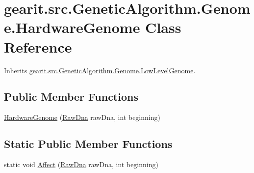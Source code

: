 \hypertarget{classgearit_1_1src_1_1_genetic_algorithm_1_1_genome_1_1_hardware_genome}{\section{gearit.\+src.\+Genetic\+Algorithm.\+Genome.\+Hardware\+Genome Class Reference}
\label{classgearit_1_1src_1_1_genetic_algorithm_1_1_genome_1_1_hardware_genome}
}


Inherits \hyperlink{classgearit_1_1src_1_1_genetic_algorithm_1_1_genome_1_1_low_level_genome}{gearit.\+src.\+Genetic\+Algorithm.\+Genome.\+Low\+Level\+Genome}.

\subsection*{Public Member Functions}
\begin{DoxyCompactItemize}
\item 
\hyperlink{classgearit_1_1src_1_1_genetic_algorithm_1_1_genome_1_1_hardware_genome_a2673bd41aaa75720cefc8d67376b5f97}{Hardware\+Genome} (\hyperlink{classgearit_1_1src_1_1_genetic_algorithm_1_1_genome_1_1_raw_dna}{Raw\+Dna} raw\+Dna, int beginning)
\end{DoxyCompactItemize}
\subsection*{Static Public Member Functions}
\begin{DoxyCompactItemize}
\item 
static void \hyperlink{classgearit_1_1src_1_1_genetic_algorithm_1_1_genome_1_1_hardware_genome_a621a629507b67f2285a9fa20aa79fd04}{Affect} (\hyperlink{classgearit_1_1src_1_1_genetic_algorithm_1_1_genome_1_1_raw_dna}{Raw\+Dna} raw\+Dna, int beginning)
\end{DoxyCompactItemize}


